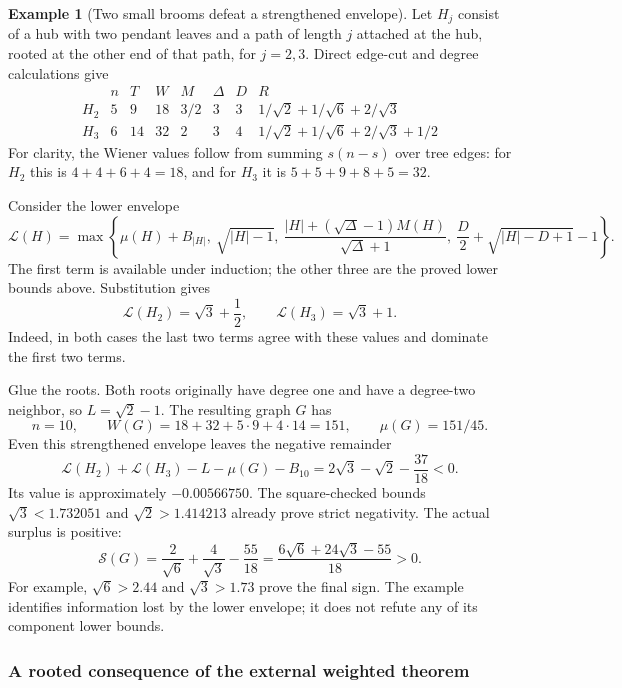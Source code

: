 \documentclass[11pt,a4paper]{article}
\theoremstyle{definition}
\newtheorem{example}[theorem]{Example}
\theoremstyle{remark}
\begin{document}
\begin{example}[Two small brooms defeat a strengthened envelope]
\label{g-ex-brooms}
Let $H_j$ consist of a hub with two pendant leaves and a path of length
$j$ attached at the hub, rooted at the other end of that path, for
$j=2,3$.  Direct edge-cut and degree calculations give
\[
\begin{array}{c|ccccccc}
 & n & T & W & M & \Delta & D & R\\ \hline
 H_2&5&9&18&3/2&3&3&1/\sqrt2+1/\sqrt6+2/\sqrt3\\
 H_3&6&14&32&2&3&4&1/\sqrt2+1/\sqrt6+2/\sqrt3+1/2
\end{array}
\]
For clarity, the Wiener values follow from summing $s(n-s)$ over tree
edges: for $H_2$ this is $4+4+6+4=18$, and for $H_3$ it is
$5+5+9+8+5=32$.

Consider the lower envelope
\[
 \mathcal L(H)=\max\left\{
 \mu(H)+B_{|H|},\ \sqrt{|H|-1},\
 \frac{|H|+(\sqrt\Delta-1)M(H)}{\sqrt\Delta+1},\
 \frac D2+\sqrt{|H|-D+1}-1\right\}.
\]
The first term is available under induction; the other three are the
proved lower bounds above.  Substitution gives
\[
 \mathcal L(H_2)=\sqrt3+\frac12,
 \qquad \mathcal L(H_3)=\sqrt3+1.
\]
Indeed, in both cases the last two terms agree with these values and
dominate the first two terms.

Glue the roots.  Both roots originally have degree one and have a
degree-two neighbor, so $L=\sqrt2-1$.  The resulting graph $G$ has
\[
 n=10,\qquad W(G)=18+32+5\cdot9+4\cdot14=151,
 \qquad \mu(G)=151/45.
\]
Even this strengthened envelope leaves the negative remainder
\begin{equation}
 \mathcal L(H_2)+\mathcal L(H_3)-L-\mu(G)-B_{10}
 =2\sqrt3-\sqrt2-\frac{37}{18}<0.
 \label{g-eq-broom-negative}
\end{equation}
Its value is approximately $-0.00566750$.  The square-checked bounds
$\sqrt3<1.732051$ and $\sqrt2>1.414213$ already prove strict negativity.
The actual surplus is positive:
\[
 \mathcal S(G)=\frac2{\sqrt6}+\frac4{\sqrt3}-\frac{55}{18}
 =\frac{6\sqrt6+24\sqrt3-55}{18}>0.
\]
For example, $\sqrt6>2.44$ and $\sqrt3>1.73$ prove the final sign.
The example identifies information lost by the lower envelope; it does
not refute any of its component lower bounds.
\end{example}

\subsubsection{A rooted consequence of the external weighted theorem}
\label{g-sub-rooted-external}
\end{document}
